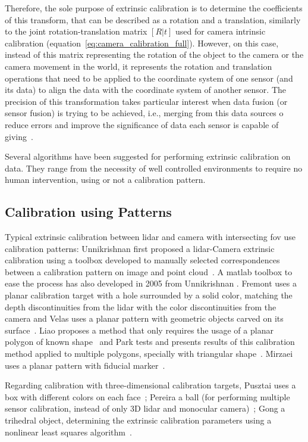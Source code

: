 Therefore, the sole purpose of extrinsic calibration is to determine the coefficients of this transform, that can be described as a rotation and a translation, similarly to the joint rotation-translation matrix $[R|t]$ used for camera intrinsic calibration (equation~\ref{eq:camera_calibration_full}). However, on this case, instead of this matrix representing the rotation of the object to the camera or the camera movement in the world, it represents the rotation and translation operations that need to be applied to the coordinate system of one sensor (and its data) to align the data with the coordinate system of another sensor. The precision of this transformation takes particular interest when data fusion (or sensor fusion) is trying to be achieved, i.e., merging from this data sources o reduce errors and improve the significance of data each sensor is capable of giving~\citeneeded. 

Several algorithms have been suggested for performing extrinsic calibration on data. They range from the necessity of well controlled environments to require no human intervention, using or not a calibration pattern. 


\subsection{Calibration using Patterns}
Typical extrinsic calibration between \ac{lidar} and camera with intersecting \ac{fov} use calibration patterns: Unnikrishnan first proposed a \ac{lidar}-Camera extrinsic calibration using a toolbox developed to manually selected correspondences between a calibration pattern on image and point cloud~\cite{Unnikrishnan2005}. A \ac{matlab} toolbox to ease the process has also developed in 2005 from Unnikrishnan \etal. Fremont \etal uses a planar calibration target with a hole surrounded by a solid color, matching the depth discontinuities from the \ac{lidar} with the color discontinuities from the camera \cite{Fremont2013} and Velas uses a planar pattern with geometric objects carved on its surface~\cite{MartinVelas2013}. Liao \etal proposes a method that only requires the usage of a planar polygon of known shape~\cite{Liao2019} and Park \etal tests and presents results of this calibration method applied to multiple polygons, specially with triangular shape~\cite{Park2014}. Mirzaei \etal uses a planar pattern with fiducial marker~\cite{Mirzaei2012}. 

Regarding calibration with three-dimensional calibration targets, Pusztai uses a box with different colors on each face~\cite{Pusztai2018}; Pereira a ball (for performing multiple sensor calibration, instead of only 3D \ac{lidar} and monocular camera)~\cite{Pereira}; Gong a trihedral object, determining the extrinsic calibration parameters using a nonlinear least squares algorithm~\cite{Gong2013}.

